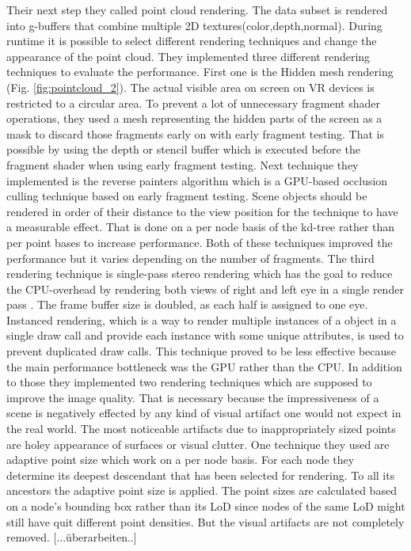 \documentclass[10pt,twocolumn,letterpaper]{article}
\begin{document}
\setlength{\parindent}{1pc}Their next step they called point cloud rendering. The data subset is rendered into g-buffers that combine multiple 2D textures(color,depth,normal). During runtime it is possible to select different rendering techniques and change the appearance of the point cloud. They implemented three different rendering techniques to evaluate the performance. First one is the Hidden mesh rendering (Fig. \ref{fig:pointcloud_2}). The actual visible area on screen on VR devices is restricted to a circular area. To prevent a lot of unnecessary fragment shader operations, they used a mesh representing the hidden parts of the screen as a mask to discard those fragments early on \cite{vlachos_advanced_2015} with early fragment testing. That is possible by using the depth or stencil buffer which is executed before the fragment shader when using early fragment testing. Next technique they implemented is the reverse painters algorithm \cite{foley1996computer} which is a GPU-based occlusion culling technique based on early fragment testing. Scene objects should be rendered in order of their distance to the view position for the technique to have a measurable effect. That is done on a per node basis of the kd-tree rather than per point bases to increase performance. Both of these techniques improved the performance but it varies depending on the number of fragments. The third rendering technique is single-pass stereo rendering which has the goal to reduce the CPU-overhead by rendering both views of right and left eye in a single render pass \cite{johansson2016efficient}. The frame buffer size is doubled, as each half is assigned to one eye. Instanced rendering, which is a way to render multiple instances of a object in a single draw call and provide each instance with some unique attributes, is used to prevent duplicated draw calls. This technique proved to be less effective because the main performance bottleneck was the GPU rather than the CPU. In addition to those they implemented two rendering techniques which are supposed to improve the image quality. That is necessary because the impressiveness of a scene is negatively effected by any kind of visual artifact one would not expect in the real world. The most noticeable artifacts due to inappropriately sized points are holey appearance of surfaces or visual clutter. One technique they used are adaptive point size which work on a per node basis. For each node they determine its deepest descendant that has been selected for rendering. To all its ancestors the adaptive point size is applied. The point sizes are calculated based on a node’s bounding box rather than its LoD since nodes of the same LoD might still have quit different point densities. But the visual artifacts are not completely removed. [...überarbeiten..]
\end{document}
